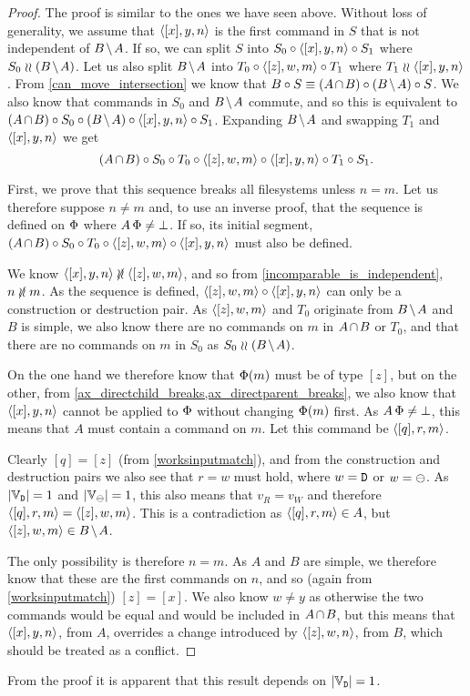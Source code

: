 \begin{proof}
The proof is similar to the ones we have seen above.
Without loss of generality, we assume that $\langle{[x],y,n}\rangle$ is the first command in $S$
that is not independent of $\bmanp$.
If so, we can split $S$ into $S_0\circ\langle{[x],y,n}\rangle\circ S_1$ where $S_0\indep\bma$.
Let us also split $\bmanp$ into $T_0\circ\langle{[z],w,m}\rangle\circ T_1$ where $T_1\mathrel{\wr\wr}\langle{[x],y,n}\rangle$.
From \cref{can_move_intersection} we know that
$B\cc S \equiv \acb\cc\bma\cc S$.
We also know that commands in $S_0$ and $\bmanp$ commute, and so this is equivalent to
$\acb\cc S_0\cc\bma\cc\cxynv\cc S_1$.
Expanding $\bmanp$ and swapping $T_1$ and $\langle{[x],y,n}\rangle$ we get
\[ (A\nobreak\hspace{-1pt plus 1pt}\nobreak\cap\nobreak\hspace{-1pt plus 1pt}\nobreak B)\circ S_0\circ T_0 \circ \langle{[z],w,m}\rangle \circ \langle{[x],y,n}\rangle\circ T_1\circ S_1. \]

First, we prove that this sequence breaks all filesystems
unless $n=m$.
Let us therefore suppose $n\neq m$ and, to use an inverse proof,
that the sequence is defined on $\Phi$ where $A\,\Phi\neq\bot$.
If so, its initial segment, $(A\nobreak\hspace{-1pt plus 1pt}\nobreak\cap\nobreak\hspace{-1pt plus 1pt}\nobreak B)\circ S_0\circ T_0 \circ \langle{[z],w,m}\rangle \circ \langle{[x],y,n}\rangle$ must also be defined.

We know $\cxynv\nindep\czwmv$, and so from \cref{incomparable_is_independent}, $n\nunrel m$.
As the sequence is defined, $\langle{[z],w,m}\rangle\circ\langle{[x],y,n}\rangle$ can only be a construction or destruction pair.
As $\langle{[z],w,m}\rangle$ and $T_0$ originate from $\bmanp$ and $B$ is simple, we also know there are
no commands on $m$ in $\acbnp$ or $T_0$,
and that there are no commands on $m$ in $S_0$ as $S_0\indep\bma$.

On the one hand we therefore know that $\Phi(m)$ must be of type $[z]$,
but on the other, from \cref{ax_directchild_breaks,ax_directparent_breaks},
we also know that $\langle{[x],y,n}\rangle$ cannot be applied to $\Phi$ without
changing $\Phi(m)$ first.
As $A\,\Phi\neq\bot$, this means that $A$ must contain a command on $m$.
Let this command be $\langle{[q],r,m}\rangle$.

Clearly $[q]=[z]$ (from \cref{worksinputmatch}), and from the construction and destruction
pairs we also see that $r=w$ must hold, where $w=\mathtt{D}$ or $w=\ominus$.
As $|\mathbb{V}_{\mathtt{D}}|=1$ and $|\mathbb{V}_{\ominus}|=1$, this also means that $v_R=v_W$ and therefore
$\langle{[q],r,m}\rangle = \langle{[z],w,m}\rangle$.
This is a contradiction as $\langle{[q],r,m}\rangle\in A$, but $\czwmv\in\bmanp$.

The only possibility is therefore $n=m$.
As $A$ and $B$ are simple, we therefore know that these are the first commands on $n$,
and so (again from \cref{worksinputmatch}) $[z]=[x]$.
We also know $w\neq y$ as otherwise the two commands would be equal and
would be included in $\acbnp$,
but this means that $\langle{[x],y,n}\rangle$, from $A$, overrides a change introduced 
by $\langle{[z],w,n}\rangle$, from $B$, which should be treated as a conflict.
\end{proof}

From the proof it is apparent that this result depends on $|\mathbb{V}_{\mathtt{D}}|=1$.

